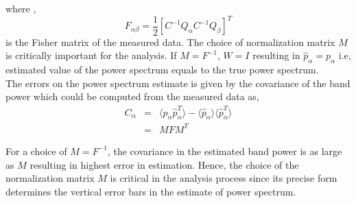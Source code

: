 \documentclass[twocolumn]{emulateapj}
\begin{document}
where , 
\begin{equation}
 F_{\alpha\beta} = \frac {1} { 2} [C^{-1}Q_{\alpha}C^{-1}Q_{\beta}]^{T}
\end{equation} 
 is the Fisher matrix of the measured data. The choice of normalization matrix $M$ is critically important for the analysis. If $M = F^{-1}$, $W=I$ resulting in $\hat p_{\alpha} = p_{\alpha}$ i.e, estimated value of the power spectrum equals to the true power spectrum.\\
 The errors on the power spectrum estimate is given by the covariance of the band power which could be computed from the measured data as,  
\begin{eqnarray}
 C_{\alpha} & = & \langle \hat p_{\alpha} \hat p_{\alpha}^{T} \rangle - \langle \hat p_{\alpha} \rangle \langle \hat p_{\alpha}^{T} \rangle \nonumber\\
 		& = & MFM^{T}
 \end{eqnarray} 
 
 For a choice of $M = F^{-1}$, the covariance in the estimated band power is as large as $M$ resulting in highest error in estimation. Hence, the choice of the normalization matrix $M$ is critical in the analysis process since its precise form determines the vertical error bars in the estimate of power spectrum. 
\end{document}
